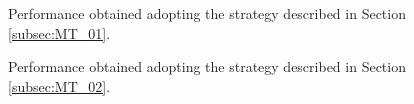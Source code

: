 \begin{figure}
	\centering
{} \quad
{} \quad
{} 
\caption{Performance obtained adopting the strategy described in Section \ref{subsec:MT_01}.}
\label{fig:res_parall_query}
\end{figure}
\begin{figure}
	\centering
{} \quad
{} \quad
{} 
\caption{Performance obtained adopting the strategy described in Section \ref{subsec:MT_02}.}
\label{fig:res_shared}
\end{figure}
